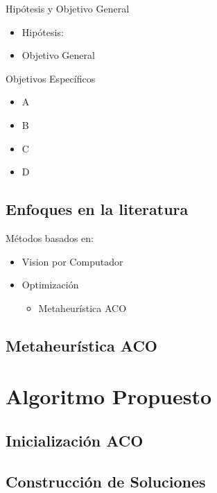 \documentclass[]{beamer}
\begin{document}
\begin{frame}{Hip\'otesis y Objetivo General}
\begin{itemize}
    \item Hip\'otesis:
    \vspace{1cm}
    \item Objetivo General
\end{itemize}
    
\end{frame}

\begin{frame}{Objetivos Espec\'ificos}
\begin{itemize}
    \item A
    \item B
    \item C
    \item D
\end{itemize}
    
\end{frame}

\subsection{Enfoques en la literatura}
\begin{frame}{M\'etodos basados en:}
    \begin{itemize}
        \item Vision por Computador
        \item Optimizaci\'on
        \begin{itemize}
            \item Metaheur\'istica ACO
        \end{itemize}
    \end{itemize}
\end{frame}


\subsection{Metaheur\'istica ACO}

\section{Algoritmo Propuesto}
\subsection{Inicializaci\'on ACO}
\subsection{Construcci\'on de Soluciones}
\end{document}
